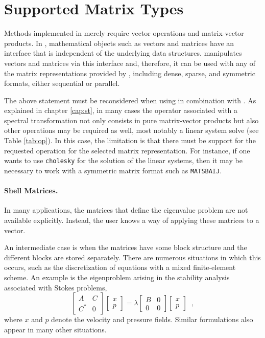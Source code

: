\section{Supported Matrix Types}
\label{sec:supported}

	Methods implemented in  merely require vector operations and matrix-vector products. In \petsc, mathematical objects such as vectors and matrices have an interface that is independent of the underlying data structures. \slepc manipulates vectors and matrices via this interface and, therefore, it can be used with any of the matrix representations provided by \petsc, including dense, sparse, and symmetric formats, either sequential or parallel.

	The above statement must be reconsidered when using  in combination with . As explained in chapter \ref{cap:st}, in many cases the operator associated with a spectral transformation not only consists in pure matrix-vector products but also other operations may be required as well, most notably a linear system solve (see Table \ref{tab:op}). In this case, the limitation is that there must be support for the requested operation for the selected matrix representation. For instance, if one wants to use \texttt{cholesky} for the solution of the linear systems, then it may be necessary to work with a symmetric matrix format such as \texttt{MATSBAIJ}.

\paragraph{Shell Matrices.}

	In many applications, the matrices that define the eigenvalue problem are not available explicitly. Instead, the user knows a way of applying these matrices to a vector.

	An intermediate case is when the matrices have some block structure and the different blocks are stored separately. There are numerous situations in which this occurs, such as the discretization of equations with a mixed finite-element scheme. An example is the eigenproblem arising in the stability analysis associated with Stokes problems,
\begin{equation}
\left[\begin{array}{cc}A & C\\C^* & 0\end{array}\right]\left[\begin{array}{c}x\\p\end{array}\right]
=\lambda\left[\begin{array}{cc}B & 0\\0 & 0\end{array}\right]\left[\begin{array}{c}x\\p\end{array}\right]\;\;,
\end{equation}
where $x$ and $p$ denote the velocity and pressure fields. Similar formulations also appear in many other situations.

